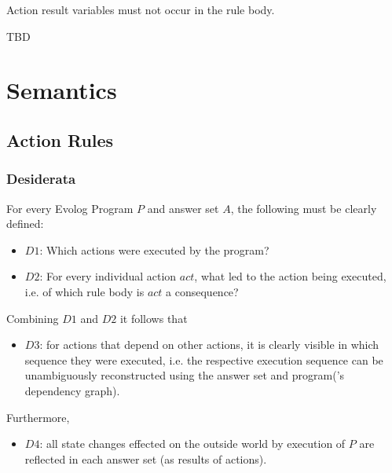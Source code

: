 Action result variables must not occur in the rule body.

\begin{definition}
TBD
\end{definition}

\section{Semantics}
\label{sec:lang-semantics}

\subsection{Action Rules}
\label{sec:lang-semantics:action-rules}

\subsubsection*{Desiderata}

For every Evolog Program $P$ and answer set $A$, the following must be clearly defined:
\begin{itemize}
	\item $D1$: Which actions were executed by the program?
	\item $D2$: For every individual action $act$, what led to the action being executed, i.e. of which rule body is $act$ a consequence?
\end{itemize}
Combining $D1$ and $D2$ it follows that 
\begin{itemize}
	\item $D3$: for actions that depend on other actions, it is clearly visible in which sequence they were executed, i.e. the respective execution sequence can be unambiguously reconstructed using the answer set and program('s dependency graph).
\end{itemize}
Furthermore,
\begin{itemize}
\item $D4$: all state changes effected on the outside world by execution of $P$ are reflected in each answer set (as results of actions).
\end{itemize}



